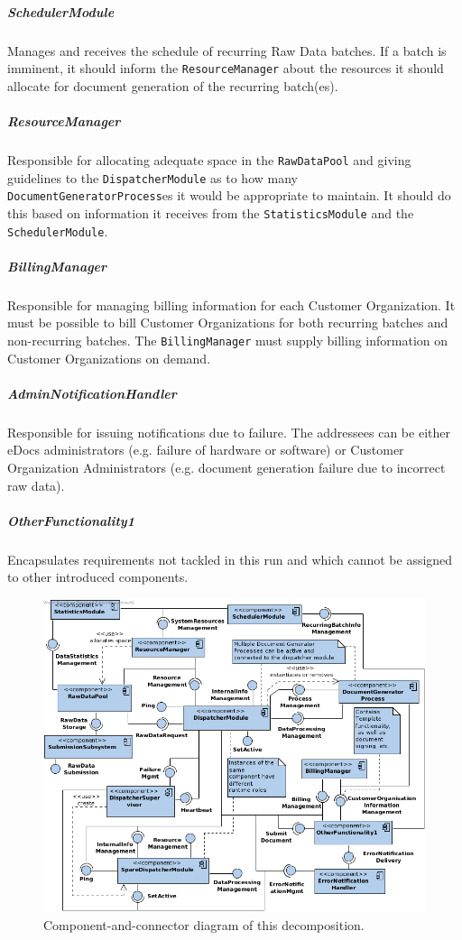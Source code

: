 \documentclass[a4paper,10pt]{article}
\begin{document}
\subparagraph{SchedulerModule}
Manages and receives the schedule of recurring Raw Data batches. If a batch is imminent, it should inform the \texttt{ResourceManager} about the resources it should allocate for document generation of the recurring batch(es).

\subparagraph{ResourceManager}
Responsible for allocating adequate space in the \texttt{RawDataPool} and giving guidelines to the \texttt{DispatcherModule} as to how many \texttt{DocumentGeneratorProcess}es it would be appropriate to maintain. It should do this based on information it receives from the \texttt{StatisticsModule} and the \texttt{SchedulerModule}.

\subparagraph{BillingManager}
Responsible for managing billing information for each Customer Organization. It must be possible to bill Customer Organizations for both recurring batches and non-recurring batches. The \texttt{BillingManager} must supply billing information on Customer Organizations on demand.

\subparagraph{AdminNotificationHandler}
Responsible for issuing notifications due to failure. The addressees can be either eDocs administrators (e.g. failure of hardware or software) or Customer Organization Administrators (e.g. document generation failure due to incorrect raw data).

\subparagraph{OtherFunctionality1}
Encapsulates requirements not tackled in this run and which cannot be
assigned to other introduced components.

\begin{figure}[!htp]
    \centering
    \includegraphics[width=\textwidth]{comp_diag_1.png}
    \caption{Component-and-connector diagram of this decomposition.}\label{fig:it1-cc_main}
\end{figure}
\end{document}
